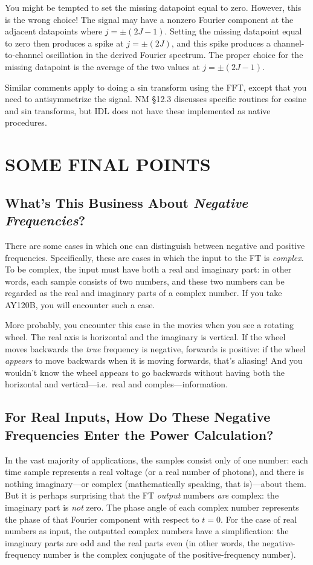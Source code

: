 \documentclass[preprint]{aastex}
\begin{document}
	You might be tempted to set the missing datapoint equal to
zero. However, this is the wrong choice! The signal may have a nonzero
Fourier component at the adjacent datapoints where $j = \pm (2J-1)$.
Setting the missing datapoint equal to zero then produces a spike at $j =
\pm (2J)$, and this spike produces a channel-to-channel oscillation in
the derived Fourier spectrum. The proper choice for the missing datapoint
is the average of the two values at $j = \pm (2J-1)$.

	Similar comments apply to doing a sin transform using the FFT,
except that you need to antisymmetrize the signal. NM \S 12.3 discusses
specific routines for cosine and sin transforms, but IDL does not have
these implemented as native procedures.

\section{SOME FINAL POINTS}

\subsection{What's This Business About {\it Negative Frequencies}?}

          There are some cases in which one can distinguish between
negative and positive frequencies. Specifically, these are cases in
which the input to the FT is {\it complex}. To be complex, the input
must have both a real and imaginary part: in other words, each sample
consists of two numbers, and these two numbers can be regarded as the
real and imaginary parts of a complex number. If you take AY120B, you
will encounter such a case. 

	More probably, you encounter this case in the movies when you
see a rotating wheel. The real axis is horizontal and the imaginary is
vertical. If the wheel moves backwards the {\it true} frequency is
negative, forwards is positive: if the wheel {\it appears} to move
backwards when it is moving forwards, that's aliasing! And you wouldn't
know the wheel appears to go backwards without having both the
horizontal and vertical---i.e.\ real and comples---information.

\subsection{For Real Inputs, How Do These Negative Frequencies Enter the
Power Calculation?}

          In the vast majority of applications, the samples consist
only of one number: each time sample represents
a real voltage (or a real number of photons), and there is nothing
imaginary---or complex (mathematically speaking, that is)---about them. 
But it is perhaps surprising that the FT {\it output} numbers {\it are}
complex: the imaginary part is {\it not} zero.  The phase angle of each
complex number represents the phase of that Fourier component with
respect to $t=0$.  For the case of real numbers as input, the outputted
complex numbers have a simplification: the imaginary parts are odd and
the real parts even (in other words, the negative-frequency number is
the complex conjugate of the positive-frequency number). 
\end{document}
